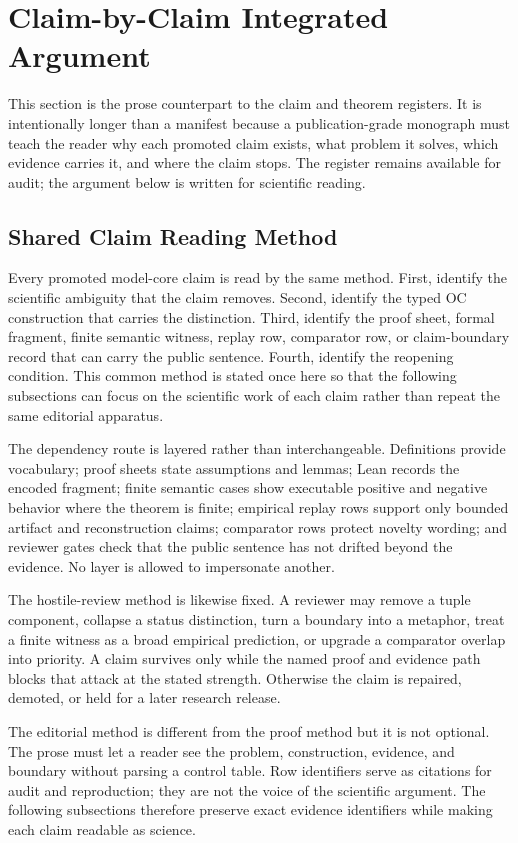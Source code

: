 \section{Claim-by-Claim Integrated Argument}
\label{sec:oc133-claim-by-claim-integrated-argument}
This section is the prose counterpart to the claim and theorem registers. It is intentionally longer than a manifest because a publication-grade monograph must teach the reader why each promoted claim exists, what problem it solves, which evidence carries it, and where the claim stops. The register remains available for audit; the argument below is written for scientific reading.

\subsection{Shared Claim Reading Method}
Every promoted model-core claim is read by the same method. First, identify the scientific ambiguity that the claim removes. Second, identify the typed OC construction that carries the distinction. Third, identify the proof sheet, formal fragment, finite semantic witness, replay row, comparator row, or claim-boundary record that can carry the public sentence. Fourth, identify the reopening condition. This common method is stated once here so that the following subsections can focus on the scientific work of each claim rather than repeat the same editorial apparatus.

The dependency route is layered rather than interchangeable. Definitions provide vocabulary; proof sheets state assumptions and lemmas; Lean records the encoded fragment; finite semantic cases show executable positive and negative behavior where the theorem is finite; empirical replay rows support only bounded artifact and reconstruction claims; comparator rows protect novelty wording; and reviewer gates check that the public sentence has not drifted beyond the evidence. No layer is allowed to impersonate another.

The hostile-review method is likewise fixed. A reviewer may remove a tuple component, collapse a status distinction, turn a boundary into a metaphor, treat a finite witness as a broad empirical prediction, or upgrade a comparator overlap into priority. A claim survives only while the named proof and evidence path blocks that attack at the stated strength. Otherwise the claim is repaired, demoted, or held for a later research release.

The editorial method is different from the proof method but it is not optional. The prose must let a reader see the problem, construction, evidence, and boundary without parsing a control table. Row identifiers serve as citations for audit and reproduction; they are not the voice of the scientific argument. The following subsections therefore preserve exact evidence identifiers while making each claim readable as science.

